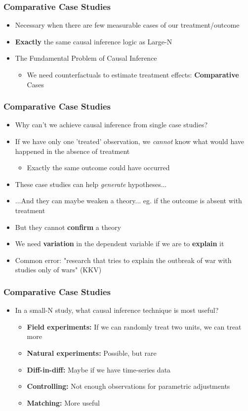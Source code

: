 \documentclass[xcolor=x11names,compress]{beamer}\usepackage[]{graphicx}\usepackage[]{color}
\renewcommand{\(}{\begin{columns}}
\renewcommand{\)}{\end{columns}}
\newcommand{\<}[1]{\begin{column}{#1}}
\renewcommand{\>}{\end{column}}
\begin{document}
\begin{frame}
\frametitle{Comparative Case Studies}
\begin{itemize}
\item Necessary when there are few measurable cases of our treatment/outcome
\pause
\item \textbf{Exactly} the same causal inference logic as Large-N
\pause
\item The Fundamental Problem of Causal Inference
\begin{itemize} 
\item We need counterfactuals to estimate treatment effects: \textbf{Comparative} Cases
\end{itemize}
\end{itemize}
\end{frame}

\begin{frame}
\frametitle{Comparative Case Studies}
\begin{itemize}
\item Why can't we achieve causal inference from single case studies?
\pause
\item If we have only one 'treated' observation, we \textit{cannot} know what would have happened in the absence of treatment
\begin{itemize}
\item Exactly the same outcome could have occurred
\end{itemize}
\pause
\item These case studies can help \textit{generate} hypotheses...
\pause
\item ...And they can maybe weaken a theory... eg. if the outcome is absent with treatment
\pause
\item But they cannot \textbf{confirm} a theory
\pause
\item We need \textbf{variation} in the dependent variable if we are to \textbf{explain} it
\pause
\item Common error: "research that tries to explain the outbreak of war with studies only of wars" (KKV)
\end{itemize}
\end{frame}

\begin{frame}
\frametitle{Comparative Case Studies}
\begin{itemize}
\item In a small-N study, what causal inference technique is most useful?
\pause
\begin{itemize}
\item \textbf{Field experiments:} If we can randomly treat two units, we can treat more
\pause
\item \textbf{Natural experiments:} Possible, but rare
\pause
\item \textbf{Diff-in-diff:} Maybe if we have time-series data
\pause
\item \textbf{Controlling:} Not enough observations for parametric adjustments
\pause
\item \textbf{Matching:} More useful
\end{itemize}
\end{itemize}
\end{frame}
\end{document}
